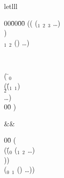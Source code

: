 \begin{optDefinition}
\begin{RewriteTable}{let}{lll}
\begin{minipage}[t]{\columnwidth}
\begin{tabbing}
    00\=00\=00\= \kill
    (( ($_1$ $_2$ $_3$ \ldots) \\
    \>\>) \\
    \>$_1$ $_2$ () \ldots) \\
\end{tabbing}
\end{minipage}\\
\begin{minipage}[t]{\columnwidth}
\begin{tabbing}
    ( \= $_0$ \\
    \>(\=($_1$ $_1$) \\
    \>\>$_2$ \\
    \>\>\ldots)\\
    00\= \kill
    \>)
\end{tabbing}
\end{minipage}
&\rewrite&
\begin{minipage}[t]{\columnwidth}
\begin{tabbing}
    00\= \kill
    (\\
    \>(\=($_0$ ($_1$ $_2$ \ldots) \\
    \>\>)) \\
    \>($_0$ $_1$ () \ldots))
\end{tabbing}%
\end{minipage}%
\end{RewriteTable}


\end{optDefinition}
